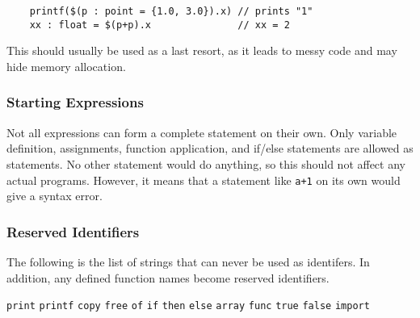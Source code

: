 \documentclass[main.tex]{subfiles}
\begin{document}
	\begin{lstlisting}
	printf($(p : point = {1.0, 3.0}).x) // prints "1"
	xx : float = $(p+p).x               // xx = 2 \end{lstlisting}
	
	This should usually be used as a last resort, as it leads to messy code and may hide memory allocation.
	
	\subsubsection{Starting Expressions}
	Not all expressions can form a complete statement on their own. Only variable definition, assignments, function application, and if/else statements are allowed as statements. No other statement would do anything, so this should not affect any actual programs. However, it means that a statement like \texttt{a+1} on its own would give a syntax error.
	
	\subsubsection{Reserved Identifiers}
	The following is the list of strings that can never be used as identifers. In addition, any defined function names become reserved identifiers.
	
	\texttt{print}  \texttt{printf}  \texttt{copy}  \texttt{free}  \texttt{of}  \texttt{if} \texttt{then}  \texttt{else}  \texttt{array}  \texttt{func}  \texttt{true}  \texttt{false}  \texttt{import}
\end{document}

